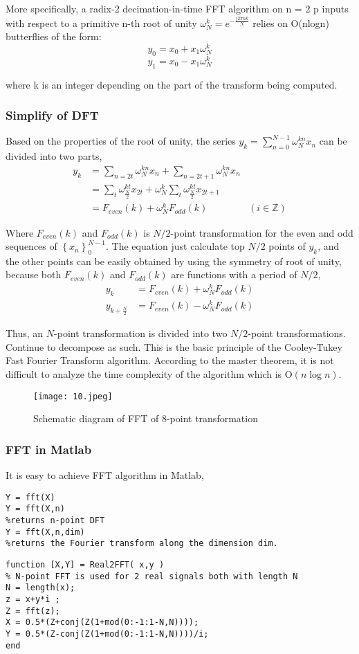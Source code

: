 \documentclass[12pt,a4paper]{article}
\begin{document}
More specifically, a radix-2 decimation-in-time FFT algorithm on n = 2 p inputs with respect to a primitive n-th root of unity $\omega _{N}^{k}=e^{-{\frac {j2\pi n
k}{N}}}$ relies on O(nlogn) butterflies of the form:
$$y_0=x_0+x_1 \omega _{N}^{k}$$
$$y_1=x_0-x_1 \omega _{N}^{k}$$

where k is an integer depending on the part of the transform being computed. 


\subsubsection{Simplify of DFT}
Based on the properties of the root of unity, the series  $ y_{k}=\sum _{n=0}^{N-1}\omega_{N}^{kn}x_{n}$ can be divided into two parts,
\begin{align*}
y_{k} &=\sum_{n=2t}\omega_{N}^{kn}x_{n}+\sum_{n=2t+1}\omega_{N}^{kn}x_{n}\\
&=\sum_{t}\omega _{\frac {N}{2}}^{kt}x_{2t}+\omega _{N}^{k}\sum _{t}\omega _{\frac {N}{2}}^{kt}x_{2t+1}\\
&=F_{even}(k)+\omega _{N}^{k}F_{odd}(k)&(i\in \mathbb {Z} )
\end{align*}

Where $F_{even}(k)$ and $F_{odd}(k)$ is $N/2$-point transformation for the even and odd sequences of $\left\{x_n \right\}^{N-1}_0$. The equation just calculate top $N/2$ points of $y_k$, and the other points can be easily obtained by using the symmetry of root of unity, because both $F_{even}(k)$ and $F_{odd}(k)$ are functions with a period of $N/2$,
\begin{align*}
y_{k}&=F_{even}(k)+\omega_{N}^{k}F_{odd}(k)\\
y_{k+{\frac {N}{2}}}&=F_{even}(k)-\omega_{N}^{k}F_{odd}(k)
\end{align*}

Thus, an $N$-point transformation is divided into two $N/2$-point transformations. Continue to decompose as such. This is the basic principle of the Cooley-Tukey Fast Fourier Transform algorithm. According to the master theorem, it is not difficult to analyze the time complexity of the algorithm which is $\mathrm {O} (n\log n)$.
\begin{figure}[hbtp]
\centering
\texttt{[image: 10.jpeg]}
\caption{Schematic diagram of FFT of 8-point transformation}
\end{figure}

\subsubsection{FFT in Matlab}
It is easy to achieve FFT algorithm in Matlab,
\lstset{language=Matlab}
\begin{lstlisting}
Y = fft(X)
Y = fft(X,n)      
%returns n-point DFT  
Y = fft(X,n,dim)  
%returns the Fourier transform along the dimension dim.
\end{lstlisting}

\lstset{language=Matlab}
\begin{lstlisting}
function [X,Y] = Real2FFT( x,y )
% N-point FFT is used for 2 real signals both with length N
N = length(x);
z = x+y*i ;
Z = fft(z);
X = 0.5*(Z+conj(Z(1+mod(0:-1:1-N,N))));
Y = 0.5*(Z-conj(Z(1+mod(0:-1:1-N,N))))/i;
end       
\end{lstlisting}
\end{document}

